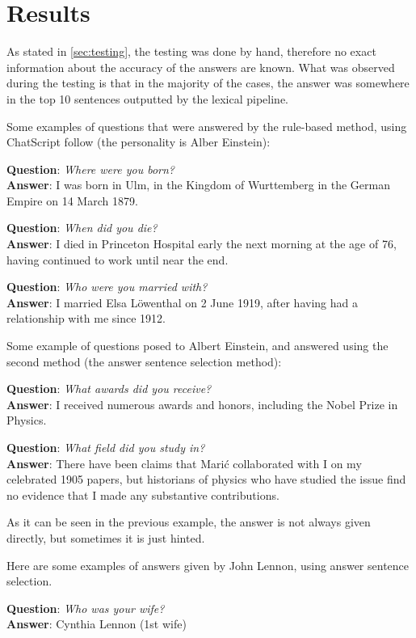\chapter{Results}
\label{chapter:results}

As stated in \autoref{sec:testing}, the testing was done by hand, therefore no exact information about the accuracy of the answers are known. What was observed during the testing is that in the majority of the cases, the answer was somewhere in the top 10 sentences outputted by the lexical pipeline.

Some examples of questions that were answered by the rule-based method, using ChatScript follow (the personality is Alber Einstein):

\textbf{Question}: {\em Where were you born?}
\\
\textbf{Answer}: I was born in Ulm, in the Kingdom of Wurttemberg in the German Empire on 14 March 1879.

\textbf{Question}: {\em When did you die?}
\\
\textbf{Answer}: I died in Princeton Hospital early the next morning at the
age of 76, having continued to work until near the end.

\textbf{Question}: {\em Who were you married with?}
\\
\textbf{Answer}: I married Elsa Löwenthal on 2 June 1919, after having
had a relationship with me since 1912.

Some example of questions posed to Albert Einstein, and answered using the second method (the answer sentence selection method):

\textbf{Question}: {\em What awards did you receive?}
\\
\textbf{Answer}: I received numerous awards and honors, including the Nobel Prize in Physics.

\textbf{Question}: {\em What field did you study in?}
\\
\textbf{Answer}: There have been claims that Marić collaborated with I on my celebrated 1905 papers, but historians of physics who have studied the issue find no evidence that I made any substantive contributions. 

As it can be seen in the previous example, the answer is not always given directly, but sometimes it is just hinted.

\pagebreak

Here are some examples of answers given by John Lennon, using answer sentence selection.

\textbf{Question}: {\em Who was your wife?}
\\
\textbf{Answer}: Cynthia Lennon (1st wife)

